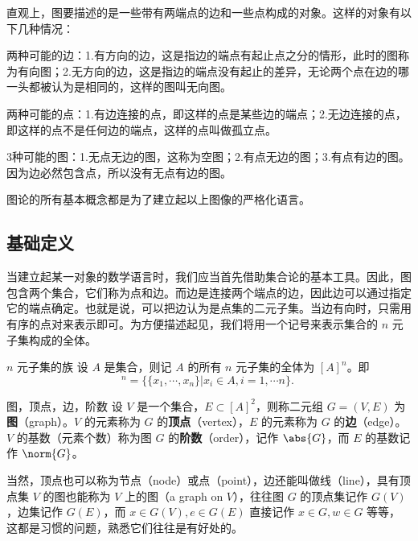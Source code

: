 \begin{issues}
\issueTODO
\end{issues}

直观上，图要描述的是一些带有两端点的边和一些点构成的对象。这样的对象有以下几种情况：

两种可能的边：1.有方向的边，这是指边的端点有起止点之分的情形，此时的图称为有向图；2.无方向的边，这是指边的端点没有起止的差异，无论两个点在边的哪一头都被认为是相同的，这样的图叫无向图。

两种可能的点：1.有边连接的点，即这样的点是某些边的端点；2.无边连接的点，即这样的点不是任何边的端点，这样的点叫做孤立点。

3种可能的图：1.无点无边的图，这称为空图；2.有点无边的图；3.有点有边的图。因为边必然包含点，所以没有无点有边的图。

图论的所有基本概念都是为了建立起以上图像的严格化语言。


\subsection{基础定义}

当建立起某一对象的数学语言时，我们应当首先借助集合论的基本工具。因此，图包含两个集合，它们称为点和边。而边是连接两个端点的边，因此边可以通过指定它的端点确定。也就是说，可以把边认为是点集的二元子集。当边有向时，只需用有序的点对来表示即可。为方便描述起见，我们将用一个记号来表示集合的 $n$ 元子集构成的全体。

\begin{definition}{$n$ 元子集的族}
设 $A$ 是集合，则记 $A$ 的所有 $n$ 元子集的全体为 $[A]^n$。即
\begin{equation}
[A]^n=\{\{x_1,\cdots,x_n\}|x_i\in A,i=1,\cdots n\}.~
\end{equation}
\end{definition}




\begin{definition}{图，顶点，边，阶数}
设 $V$ 是一个集合，$E\subset [A]^2$，则称二元组 $G=(V,E)$ 为\textbf{图}（graph）。$V$ 的元素称为 $G$ 的\textbf{顶点}（vertex），$E$ 的元素称为 $G$ 的\textbf{边}（edge）。$V$ 的基数（元素个数）称为图 $G$ 的\textbf{阶数}（order），记作 $\abs{G}$，而 $E$ 的基数记作 $\norm{G}$。
\end{definition}

当然，顶点也可以称为节点（node）或点（point），边还能叫做线（line），具有顶点集 $V$ 的图也能称为 $V$ 上的图（a graph on $V$），往往图 $G$ 的顶点集记作 $G(V)$，边集记作 $G(E)$，而 $x\in G(V),e\in G(E)$ 直接记作 $x\in G,w\in G$ 等等，这都是习惯的问题，熟悉它们往往是有好处的。

